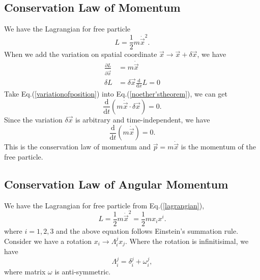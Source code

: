 \documentclass[%
 reprint,
 amsmath,amssymb,
 aps,
]{revtex4-1}
\begin{document}
\subsection{Conservation Law of Momentum}
We have the Lagrangian for free particle
\begin{equation}
    L=\frac{1}{2}m\dot{\vec{x}}^2.
\label{lagrangian}
\end{equation}
When we add the variation on spatial coordinate $\vec{x}\rightarrow\vec{x}+\delta\vec{x}$, we have
\begin{equation}
\begin{aligned}
    \frac{\partial L}{\partial\dot{\vec{x}}}&=m\dot{\vec{x}}
    \\\delta L&=\delta\vec{x}\frac{\mathrm{d}}{\mathrm{d}x}L=0
\end{aligned}
\label{variationofposition}
\end{equation}
Take Eq.(\ref{variationofposition}) into Eq.(\ref{noether'stheorem}), we can get
\begin{equation}
    \frac{\mathrm{d}}{\mathrm{d}t}(m\dot{\vec{x}}\cdot\delta\vec{x})=0.
\end{equation}
Since the variation $\delta\vec{x}$ is arbitrary and time-independent, we have
\begin{equation}
    \frac{\mathrm{d}}{\mathrm{d}t}(m\dot{\vec{x}})=0.
\end{equation}
This is the conservation law of momentum and $\vec{p}=m\dot{\vec{x}}$ is the momentum of the free particle.
\subsection{Conservation Law of Angular Momentum}
We have the Lagrangian for free particle from Eq.(\ref{lagrangian}),
\begin{equation}
    L=\frac{1}{2}m\dot{\vec{x}}^2=\frac{1}{2}mx_ix^i.
\end{equation}
where $i=1,2,3$ and the above equation follows Einstein's summation rule.
Consider we have a rotation $x_i\rightarrow\Lambda_i^jx_j$. Where the rotation is infinitisimal, we have 
\begin{equation}
    \Lambda_i^j=\delta_i^j+\omega_i^j,
\end{equation}
where matrix $\omega$ is anti-symmetric.
\end{document}
